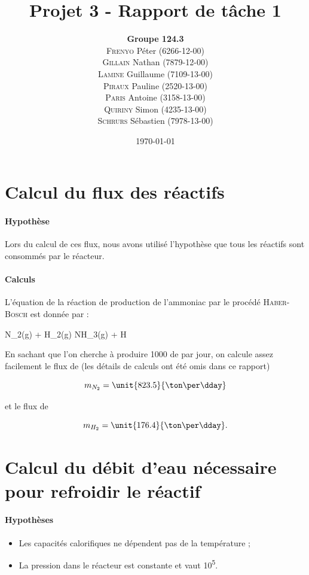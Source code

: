 \documentclass{article}
\title{Projet 3 - Rapport de tâche 1}
\author{\textbf{Groupe 124.3}
\\
\textsc{Frenyo} P\'eter (6266-12-00)\\
\textsc{Gillain} Nathan (7879-12-00)\\
\textsc{Lamine} Guillaume (7109-13-00)\\
\textsc{Piraux} Pauline (2520-13-00)\\
\textsc{Paris} Antoine (3158-13-00)\\
\textsc{Quiriny} Simon (4235-13-00)\\
\textsc{Schrurs} Sébastien (7978-13-00)}
\date{\today}
\begin{document}
\maketitle

\section{Calcul du flux des réactifs}

\paragraph{Hypothèse}
Lors du calcul de ces flux, nous avons utilisé l'hypothèse que tous les réactifs sont 
consommés par le réacteur.

\paragraph{Calculs}
L'équation de la réaction de production de l'ammoniac par le procédé \textsc{Haber-Bosch} est donnée par :

	\begin{chemmath}
			N_2(g) + H_2(g) \longrightarrow NH_3(g) + \Delta H
 	\end{chemmath}
	
En sachant que l'on cherche à produire \unit{1000}{\ton} de  par jour, 
on calcule assez facilement le flux de  (les détails de calculs ont été omis
dans ce rapport)

	$$m_{N_2} = \unit{823.5}{\ton\per\dday}$$

et le flux de 

	$$m_{H_2} = \unit{176.4}{\ton\per\dday}.$$

\section{Calcul du débit d'eau nécessaire pour refroidir le réactif}
\paragraph{Hypothèses}
\begin{itemize}
	\item Les capacités calorifiques ne dépendent pas de la température ;
	\item La pression dans le réacteur est constante et vaut \unit{10^5}{\pascal}.
\end{itemize}
\end{document}
